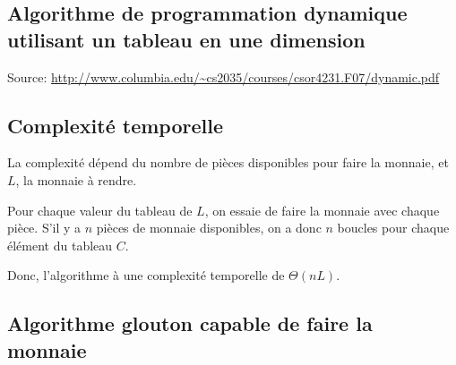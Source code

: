 \documentclass[10.9pt]{article} %
\begin{document}
\subsection{Algorithme de programmation dynamique utilisant un tableau en une dimension}

Source: \url{http://www.columbia.edu/~cs2035/courses/csor4231.F07/dynamic.pdf}

\begin{algorithm}
\end{algorithm}

\subsection{Complexité temporelle}

La complexité dépend du nombre de pièces disponibles pour faire la monnaie, et $L$, la monnaie
à rendre.

Pour chaque valeur du tableau de $L$, on essaie de faire la monnaie avec chaque pièce.
S'il y a $n$ pièces de monnaie disponibles, on a donc $n$ boucles pour chaque élément du
tableau $C$.

Donc, l'algorithme à une complexité temporelle de $\Theta(nL)$.

\subsection{Algorithme glouton capable de faire la monnaie}
\end{document}
